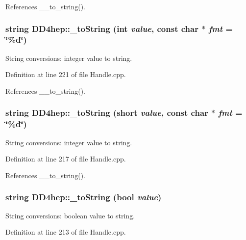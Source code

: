 References \_\-\_\-to\_\-string().\hypertarget{group___d_d4_h_e_p___g_e_o_m_e_t_r_y_ga7c5be2d7907e4e1d8ce7a2396b10b695}{
\subsubsection[{\_\-toString}]{\setlength{\rightskip}{0pt plus 5cm}string DD4hep::\_\-toString (int {\em value}, \/  const char $\ast$ {\em fmt} = {\ttfamily \char`\"{}\%d\char`\"{}})}}
\label{group___d_d4_h_e_p___g_e_o_m_e_t_r_y_ga7c5be2d7907e4e1d8ce7a2396b10b695}


String conversions: integer value to string. 

Definition at line 221 of file Handle.cpp.

References \_\-\_\-to\_\-string().\hypertarget{group___d_d4_h_e_p___g_e_o_m_e_t_r_y_ga33b8273e6b24bc97470fb7681a071e5f}{
\subsubsection[{\_\-toString}]{\setlength{\rightskip}{0pt plus 5cm}string DD4hep::\_\-toString (short {\em value}, \/  const char $\ast$ {\em fmt} = {\ttfamily \char`\"{}\%d\char`\"{}})}}
\label{group___d_d4_h_e_p___g_e_o_m_e_t_r_y_ga33b8273e6b24bc97470fb7681a071e5f}


String conversions: integer value to string. 

Definition at line 217 of file Handle.cpp.

References \_\-\_\-to\_\-string().\hypertarget{group___d_d4_h_e_p___g_e_o_m_e_t_r_y_gaf0b4c8d8a6efc966a3609c4594448050}{
\subsubsection[{\_\-toString}]{\setlength{\rightskip}{0pt plus 5cm}string DD4hep::\_\-toString (bool {\em value})}}
\label{group___d_d4_h_e_p___g_e_o_m_e_t_r_y_gaf0b4c8d8a6efc966a3609c4594448050}


String conversions: boolean value to string. 

Definition at line 213 of file Handle.cpp.


